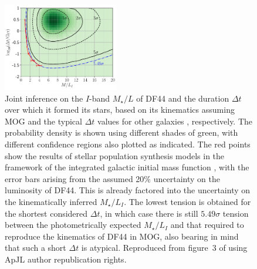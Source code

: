 \documentclass[fleqn,usenatbib,useAMS,onecolumn]{mnras} %
\begin{document}
\begin{figure}
	\centering
	\includegraphics[width=0.45\textwidth]{Haghi_2019_DF44_Figure_3_MOG}
	\caption{Joint inference on the $I$-band $M_{\star}/L$ of DF44 and the duration $\Delta t$ over which it formed its stars, based on its kinematics \citep{Van_Dokkum_2019} assuming MOG and the typical $\Delta t$ values for other galaxies \citep{Jan_2009}, respectively. The probability density is shown using different shades of green, with different confidence regions also plotted as indicated. The red points show the results of stellar population synthesis models in the framework of the integrated galactic initial mass function \citep{Kroupa_2003}, with the error bars arising from the assumed 20\% uncertainty on the luminosity of DF44. This is already factored into the uncertainty on the kinematically inferred $M_{\star}/L_I$. The lowest tension is obtained for the shortest considered $\Delta t$, in which case there is still $5.49\sigma$ tension between the photometrically expected $M_{\star}/L_I$ and that required to reproduce the kinematics of DF44 in MOG, also bearing in mind that such a short $\Delta t$ is atypical. Reproduced from figure~3 of \citet{Haghi_2019_DF44} using ApJL author republication rights.}
	\label{Haghi_2019_DF44_Figure_3_MOG}
\end{figure}
\end{document}
